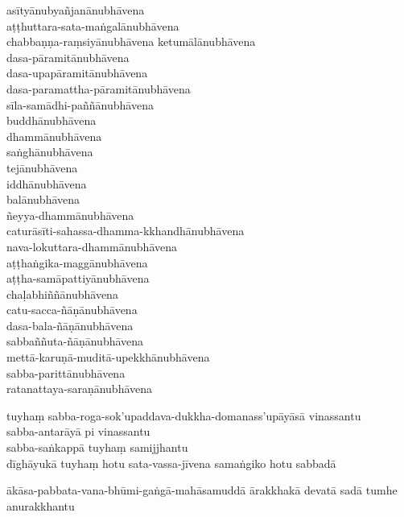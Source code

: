 asītyānubyañjanānubhāvena\\
aṭṭhuttara-sata-maṅgalānubhāvena\\
chabbaṇṇa-raṃsiyānubhāvena ketumālānubhāvena\\
dasa-pāramitānubhāvena\\
dasa-upapāramitānubhāvena\\
dasa-paramattha-pāramitānubhāvena\\
sīla-samādhi-paññānubhāvena\\
buddhānubhāvena\\
dhammānubhāvena\\
saṅghānubhāvena\\
tejānubhāvena\\
iddhānubhāvena\\
balānubhāvena\\
ñeyya-dhammānubhāvena\\
caturāsīti-sahassa-dhamma-kkhandhānubhāvena\\
nava-lokuttara-dhammānubhāvena\\
aṭṭhaṅgika-maggānubhāvena\\
aṭṭha-samāpattiyānubhāvena\\
chaḷabhiññānubhāvena\\
catu-sacca-ñāṇānubhāvena\\
dasa-bala-ñāṇānubhāvena\\
sabbaññuta-ñāṇānubhāvena\\
mettā-karuṇā-muditā-upekkhānubhāvena\\
sabba-parittānubhāvena\\
ratanattaya-saraṇānubhāvena

tuyhaṃ sabba-roga-sok'upaddava-dukkha-domanass'upāyāsā vinassantu\\
sabba-antarāyā pi vinassantu\\
sabba-saṅkappā tuyhaṃ samijjhantu\\
dīghāyukā tuyhaṃ hotu sata-vassa-jīvena samaṅgiko hotu sabbadā

ākāsa-pabbata-vana-bhūmi-gaṅgā-mahāsamuddā ārakkhakā
devatā sadā tumhe anurakkhantu


